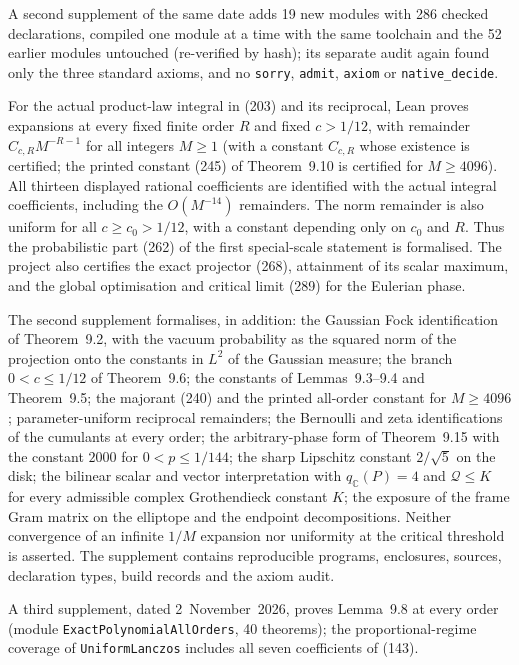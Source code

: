 \documentclass[11pt,a4paper]{article}
\newcommand{\eq}[1]{(#1)}
\begin{document}
A second supplement of the same date adds 19 new modules with 286 checked declarations, compiled one module at a time with the same toolchain and the 52 earlier modules untouched (re-verified by hash); its separate audit again found only the three standard axioms, and no \texttt{sorry}, \texttt{admit}, \texttt{axiom} or \texttt{native\_decide}.

For the actual product-law integral in \eq{203} and its reciprocal, Lean proves expansions at every fixed finite order $R$ and fixed $c>1/12$, with remainder $C_{c,R}M^{-R-1}$ for all integers $M\geq1$ (with a constant $C_{c,R}$ whose existence is certified; the printed constant \eq{245} of Theorem~9.10 is certified for $M\geq4096$). All thirteen displayed rational coefficients are identified with the actual integral coefficients, including the $O(M^{-14})$ remainders. The norm remainder is also uniform for all $c\geq c_0>1/12$, with a constant depending only on $c_0$ and $R$. Thus the probabilistic part \eq{262} of the first special-scale statement is formalised. The project also certifies the exact projector \eq{268}, attainment of its scalar maximum, and the global optimisation and critical limit \eq{289} for the Eulerian phase.

The second supplement formalises, in addition: the Gaussian Fock identification of Theorem~9.2, with the vacuum probability as the squared norm of the projection onto the constants in $L^2$ of the Gaussian measure; the branch $0<c\leq1/12$ of Theorem~9.6; the constants of Lemmas~9.3--9.4 and Theorem~9.5; the majorant \eq{240} and the printed all-order constant for $M\geq4096$; parameter-uniform reciprocal remainders; the Bernoulli and zeta identifications of the cumulants at every order; the arbitrary-phase form of Theorem~9.15 with the constant $2000$ for $0<p\leq1/144$; the sharp Lipschitz constant $2/\sqrt5$ on the disk; the bilinear scalar and vector interpretation with $q_{\mathbb C}(P)=4$ and $\mathcal Q\leq K$ for every admissible complex Grothendieck constant $K$; the exposure of the frame Gram matrix on the elliptope and the endpoint decompositions. Neither convergence of an infinite $1/M$ expansion nor uniformity at the critical threshold is asserted. The supplement contains reproducible programs, enclosures, sources, declaration types, build records and the axiom audit.

A third supplement, dated 2~November~2026, proves Lemma~9.8 at every order (module \texttt{ExactPolynomialAllOrders}, 40 theorems); the proportional-regime coverage of \texttt{UniformLanczos} includes all seven coefficients of \eq{143}.
\end{document}
